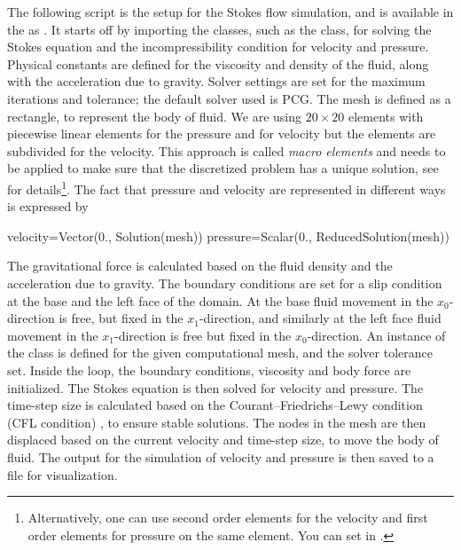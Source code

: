 The following \PYTHON script is the setup for the Stokes flow simulation, and
is available in the \ExampleDirectory as .
It starts off by importing the classes, such as the 
class, for solving the Stokes equation and the incompressibility condition for
velocity and pressure.
Physical constants are defined for the viscosity and density of the fluid,
along with the acceleration due to gravity.
Solver settings are set for the maximum iterations and tolerance; the default
solver used is PCG.
The mesh is defined as a rectangle, to represent the body of fluid.
We are using $20 \times 20$ elements with piecewise linear elements for the
pressure and for velocity but the elements are subdivided for the velocity.
This approach is called \textit{macro elements} and
needs to be applied to make sure that the discretized problem has a unique
solution, see~\cite{LBB} for details\footnote{Alternatively, one can use
second order elements for the velocity and first order elements for pressure
on the same element. You can set  in .}.
The fact that pressure and velocity are represented in different ways is
expressed by
\begin{python}
  velocity=Vector(0., Solution(mesh))
  pressure=Scalar(0., ReducedSolution(mesh))
\end{python}
The gravitational force is calculated based on the fluid density and the
acceleration due to gravity.
The boundary conditions are set for a slip condition at the base and the left
face of the domain. At the base fluid movement in the $x_{0}$-direction
is free, but fixed in the $x_{1}$-direction, and similarly at the left
face fluid movement in the $x_{1}$-direction is free  but fixed in
the $x_{0}$-direction.
An instance of the  class is defined for the
given computational mesh, and the solver tolerance set.
Inside the  loop, the boundary conditions, viscosity and body
force are initialized.
The Stokes equation is then solved for velocity and pressure.
The time-step size is calculated based on the Courant–Friedrichs–Lewy condition (CFL condition)  , to ensure stable solutions.
The nodes in the mesh are then displaced based on the current velocity and
time-step size, to move the body of fluid.
The output for the simulation of velocity and pressure is then saved to a file
for visualization.
%
